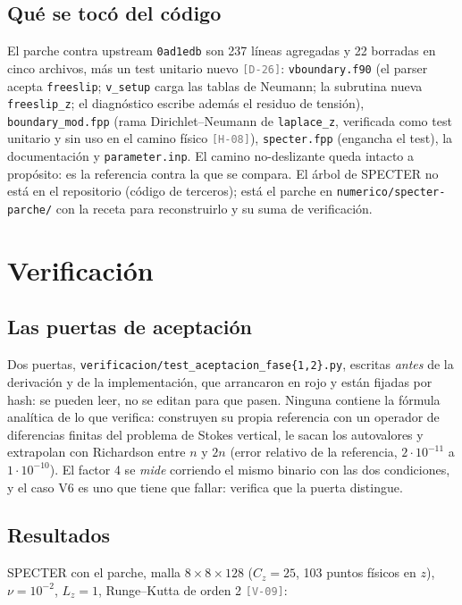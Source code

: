 \documentclass[11pt,a4paper]{article}
\newcommand{\etq}[1]{\textcolor{gray}{\texttt{[#1]}}}
\begin{document}
\subsection{Qué se tocó del código}

El parche contra upstream \texttt{0ad1edb} son 237 líneas agregadas y 22 borradas en
cinco archivos, más un test unitario nuevo \etq{D-26}:
\texttt{vboundary.f90} (el parser acepta \texttt{freeslip}; \texttt{v\_setup} carga las
tablas de Neumann; la subrutina nueva \texttt{freeslip\_z}; el diagnóstico escribe además
el residuo de tensión), \texttt{boundary\_mod.fpp} (rama Dirichlet--Neumann de
\texttt{laplace\_z}, verificada como test unitario y sin uso en el camino físico
\etq{H-08}), \texttt{specter.fpp} (engancha el test), la documentación y
\texttt{parameter.inp}. El camino no-deslizante queda intacto a propósito: es la
referencia contra la que se compara. El árbol de SPECTER no está en el repositorio
(código de terceros); está el parche en \texttt{numerico/specter-parche/} con la receta
para reconstruirlo y su suma de verificación.

\section{Verificación}
\label{sec:verificacion}

\subsection{Las puertas de aceptación}

Dos puertas, \texttt{verificacion/test\_aceptacion\_fase\{1,2\}.py}, escritas
\emph{antes} de la derivación y de la implementación, que arrancaron en rojo y están
fijadas por hash: se pueden leer, no se editan para que pasen. Ninguna contiene la
fórmula analítica de lo que verifica: construyen su propia referencia con un operador de
diferencias finitas del problema de Stokes vertical, le sacan los autovalores y
extrapolan con Richardson entre $n$ y $2n$ (error relativo de la referencia,
$2\cdot10^{-11}$ a $1\cdot10^{-10}$). El factor 4 se \emph{mide} corriendo el mismo binario
con las dos condiciones, y el caso V6 es uno que tiene que fallar: verifica que la puerta
distingue.

\subsection{Resultados}

SPECTER con el parche, malla $8\times8\times128$ ($C_z=25$, 103 puntos físicos en $z$),
$\nu=10^{-2}$, $L_z=1$, Runge--Kutta de orden 2 \etq{V-09}:
\end{document}
